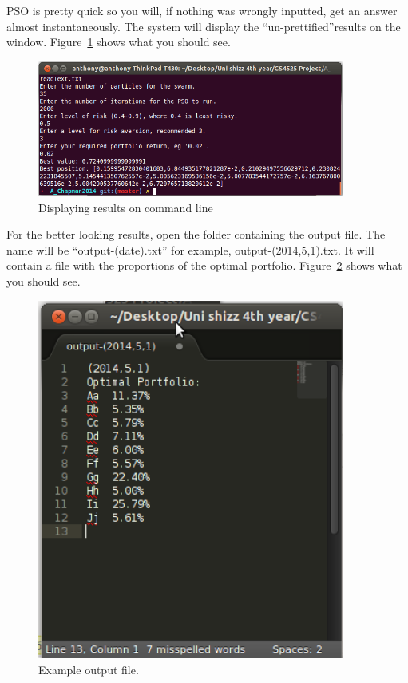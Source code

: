 \documentclass{pdfmx4020}
\begin{document}
PSO is pretty quick so you will, if nothing was wrongly inputted, get an answer almost instantaneously. The system will display the ``un-prettified''results on the window. Figure~\ref{fig:results} shows what you should see. 
\begin{figure}[H]
  \centering
    \includegraphics[width=0.9\textwidth]{results}
  \caption{Displaying results on command line}
  \label{fig:results}
\end{figure}
For the better looking results, open the folder containing the output file. The name will be ``output-(date).txt'' for example, output-(2014,5,1).txt. It will contain a file with the proportions of the optimal portfolio. Figure~\ref{fig:output} shows what you should see. 
\begin{figure}[H]
  \centering
    \includegraphics[width=0.9\textwidth]{output}
  \caption{Example output file.}
  \label{fig:output}
\end{figure}
\end{document}
